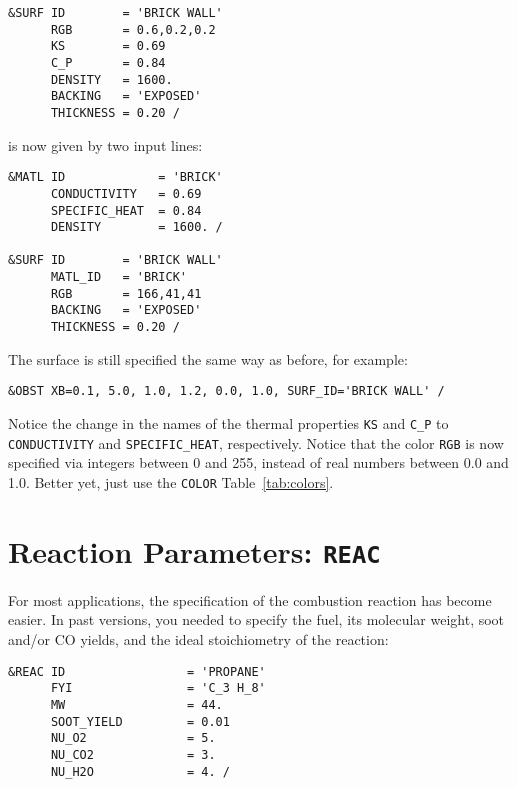 \documentclass[11pt]{book}
\newcommand{\ct}{\tt\small}
\begin{document}
\footnotesize
\begin{verbatim}
&SURF ID        = 'BRICK WALL'
      RGB       = 0.6,0.2,0.2
      KS        = 0.69
      C_P       = 0.84
      DENSITY   = 1600.
      BACKING   = 'EXPOSED'
      THICKNESS = 0.20 /
\end{verbatim}
\normalsize

\noindent
is now given by two input lines:

\footnotesize
\begin{verbatim}
&MATL ID             = 'BRICK'
      CONDUCTIVITY   = 0.69
      SPECIFIC_HEAT  = 0.84
      DENSITY        = 1600. /

&SURF ID        = 'BRICK WALL'
      MATL_ID   = 'BRICK'
      RGB       = 166,41,41
      BACKING   = 'EXPOSED'
      THICKNESS = 0.20 /
\end{verbatim}
\normalsize

\noindent
The surface is still specified the same way as before, for example:

\footnotesize
\begin{verbatim}
&OBST XB=0.1, 5.0, 1.0, 1.2, 0.0, 1.0, SURF_ID='BRICK WALL' /
\end{verbatim}
\normalsize

\noindent
Notice the change in the names of the thermal properties {\ct KS} and {\ct C\_P} to {\ct CONDUCTIVITY} and
{\ct SPECIFIC\_HEAT}, respectively. Notice that the color {\ct RGB} is now specified via integers between 0 and 255, instead of
real numbers between 0.0 and 1.0. Better yet, just use the {\ct COLOR} Table~\ref{tab:colors}.



\section{Reaction Parameters: \texorpdfstring{{\tt REAC}}{REAC}}

For most applications, the specification of the combustion reaction has become easier. In past versions, you needed to specify the fuel, its molecular weight, soot and/or CO yields, and the ideal stoichiometry of the reaction:

\footnotesize
\begin{verbatim}
&REAC ID                 = 'PROPANE'
      FYI                = 'C_3 H_8'
      MW                 = 44.
      SOOT_YIELD         = 0.01
      NU_O2              = 5.
      NU_CO2             = 3.
      NU_H2O             = 4. /
\end{verbatim}
\normalsize
\end{document}
